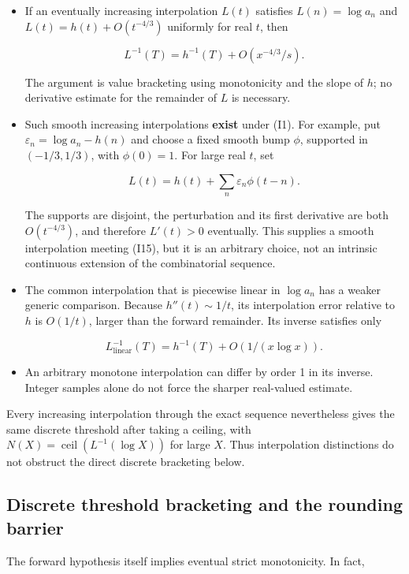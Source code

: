 \documentclass[11pt,letterpaper]{article}
\numberwithin{equation}{section}
\theoremstyle{remark}
\begin{document}
\begin{itemize}
\item
  If an eventually increasing interpolation \(L(t)\) satisfies \(L(n)=\log a_n\) and \(L(t)=h(t)+O(t^{-4/3})\) uniformly for real \(t\), then

  \[
  L^{-1}(T)=h^{-1}(T)+O(x^{-4/3}/s).
  \tag{I15}
  \]

  The argument is value bracketing using monotonicity and the slope of \(h\); no derivative estimate for the remainder of \(L\) is necessary.
\item
  Such smooth increasing interpolations \textbf{exist} under (I1). For example, put \(\varepsilon_n=\log a_n-h(n)\) and choose a fixed smooth bump \(\phi\), supported in \((-1/3,1/3)\), with \(\phi(0)=1\). For large real \(t\), set

  \[
  L(t)=h(t)+\sum_n\varepsilon_n\phi(t-n).
  \]

  The supports are disjoint, the perturbation and its first derivative are both \(O(t^{-4/3})\), and therefore \(L'(t)>0\) eventually. This supplies a smooth interpolation meeting (I15), but it is an arbitrary choice, not an intrinsic continuous extension of the combinatorial sequence.
\item
  The common interpolation that is piecewise linear in \(\log a_n\) has a weaker generic comparison. Because \(h''(t)\sim 1/t\), its interpolation error relative to \(h\) is \(O(1/t)\), larger than the forward remainder. Its inverse satisfies only

  \[
  L_{\mathrm{linear}}^{-1}(T)=h^{-1}(T)+O(1/(x\log x)).
  \tag{I16}
  \]
\item
  An arbitrary monotone interpolation can differ by order 1 in its inverse. Integer samples alone do not force the sharper real-valued estimate.
\end{itemize}

Every increasing interpolation through the exact sequence nevertheless gives the same discrete threshold after taking a ceiling, with \(N(X)=\operatorname{ceil}(L^{-1}(\log X))\) for large \(X\). Thus interpolation distinctions do not obstruct the direct discrete bracketing below.

\subsection{Discrete threshold bracketing and the rounding barrier}\label{air:rb:discrete-threshold-bracketing-and-the-rounding-barrier}

The forward hypothesis itself implies eventual strict monotonicity. In fact,
\end{document}
